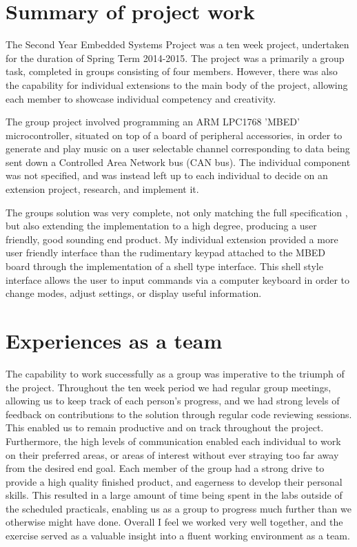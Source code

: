 \section{Summary of project work}
The Second Year Embedded Systems Project was a ten week project, undertaken 
for the duration of Spring Term 2014-2015. The project was a primarily a 
group task, completed in groups consisting of four members. However, there 
was also the capability for individual extensions to the main body of the 
project, allowing each member to showcase individual competency and creativity.
\par\bigskip\noindent
The group project involved programming an ARM LPC1768 'MBED' microcontroller, 
situated on top of a board of peripheral accessories, in order to 
generate and play music on a user selectable channel corresponding to data 
being sent down a Controlled Area Network bus (CAN bus). The individual 
component was not specified, and was instead left up to each individual to 
decide on an extension project, research, and implement it. 
\par\bigskip\noindent
The groups solution was very complete, not only matching the full specification
, but also extending the implementation to a high degree, producing a user 
friendly, good sounding end product. My individual extension provided a more 
user friendly interface than the 
rudimentary keypad attached to the MBED board through the implementation of a 
shell type interface. This shell style interface allows the user to input 
commands via a computer keyboard in order to change modes, adjust settings,
or display useful information.

 
\section{Experiences as a team}
The capability to work successfully as a group was imperative to the triumph of
the project. Throughout the ten week period we had regular group meetings, 
allowing us to keep track of each person's progress, and we had strong levels 
of feedback on contributions to the solution through regular code reviewing 
sessions. This enabled us to remain productive and on track throughout the 
project. 
Furthermore, the high levels of communication enabled each individual to work 
on their preferred areas, or areas of interest without ever straying too far 
away from the desired end goal. 
Each member of the group had a strong drive to 
provide a high quality finished product, and eagerness to develop their 
personal skills. This resulted in a large amount of time being spent in the 
labs outside of the scheduled practicals, enabling us as a group to progress 
much further than we otherwise might have done. Overall I feel we worked very 
well together, and the exercise served as a valuable insight into a fluent 
working environment as a team. 


